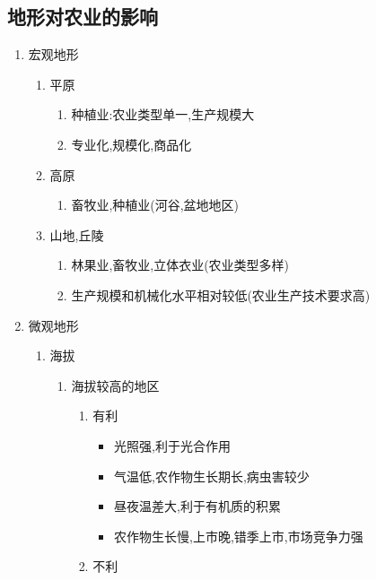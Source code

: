 \documentclass[a4paper]{article}
\begin{document}
    \subsection{地形对农业的影响}
    \begin{enumerate}
        \item 宏观地形
        \begin{enumerate}
            \item 平原
            \begin{enumerate}
                \item 种植业:农业类型单一,生产规模大
                \item 专业化,规模化,商品化
            \end{enumerate}
            \item 高原
            \begin{enumerate}
                \item 畜牧业,种植业(河谷,盆地地区)
            \end{enumerate}
            \item 山地,丘陵
            \begin{enumerate}
                \item 林果业,畜牧业,立体衣业(农业类型多样)
                \item 生产规模和机械化水平相对较低(农业生产技术要求高) %
            \end{enumerate}
        \end{enumerate}
        \item 微观地形
        \begin{enumerate}
            \item 海拔
            \begin{enumerate}
                \item 海拔较高的地区
                \begin{enumerate}
                    \item 有利
                    \begin{itemize}
                        \item 光照强,利于光合作用
                        \item 气温低,农作物生长期长,病虫害较少
                        \item 昼夜温差大,利于有机质的积累
                        \item 农作物生长慢,上市晚,错季上市,市场竞争力强
                    \end{itemize}
                    \item 不利

\end{enumerate}
\end{enumerate}
\end{enumerate}
\end{enumerate}
\end{document}
